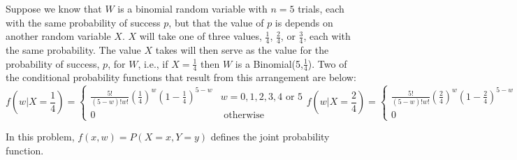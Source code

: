 \documentclass[addpoints]{examsetup}\usepackage[]{graphicx}\usepackage[]{color}
\begin{document}
\begin{questions}
\newpage

\question

Suppose we know that $W$ is a binomial random variable with $n = 5$ trials, 
each with the same probability of success $p$, but that the value of $p$ is depends on another random variable $X$.
$X$ will take one of three values, $\frac{1}{4}$, $\frac{2}{4}$, or $\frac{3}{4}$, each with the same probability.
The value $X$ takes will then serve as the value for the probability of success, $p$, for $W$, i.e., if $X = \frac{1}{4}$ then $W$ is a Binomial(5,$\frac{1}{4}$). 
Two of the conditional probability functions that result from this arrangement are below:
$$
f(w|X = \frac{1}{4}) = 
\begin{cases}
   \frac{5!}{(5-w)! w!} (\frac{1}{4})^w (1 - \frac{1}{4})^{5 - w} & w = 0, 1, 2, 3, 4 \text{ or } 5 \\
   0 &  \text{ otherwise }
\end{cases}
f(w|X = \frac{2}{4}) = 
\begin{cases}
   \frac{5!}{(5-w)! w!} (\frac{2}{4})^w (1 - \frac{2}{4})^{5 - w} & w = 0, 1, 2, 3, 4 \text{ or } 5 \\
   0 &  \text{ otherwise }
\end{cases}
$$

In this problem, $f(x,w) = P(X = x, Y = y)$ defines the joint probability function.
\end{questions}
\end{document}
